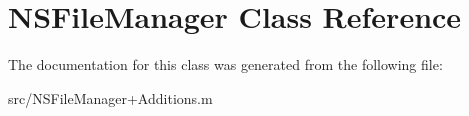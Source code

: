 \hypertarget{class_n_s_file_manager}{
\section{NSFileManager Class Reference}
\label{class_n_s_file_manager}
}


The documentation for this class was generated from the following file:\begin{DoxyCompactItemize}
\item 
src/NSFileManager+Additions.m\end{DoxyCompactItemize}
